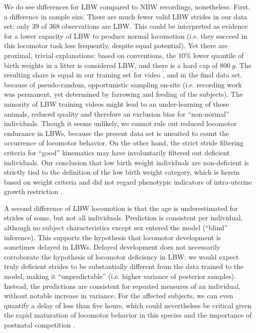 We do see differences for LBW compared to NBW recordings, nonetheless.
First, a difference in sample size.
There are much fewer valid LBW strides in our data set: only \(39\) of \(368\) observations are LBW.
This could be interpreted as evidence for a lower capacity  of LBW to produce normal locomotion (i.e. they succeed in this locomotor task less frequently, despite equal potential).
Yet there are proximal, trivial explanations: based on conventions, the \(10 \%\) lower quantile of birth weights in a litter is considered LBW, and there is a hard cap of \(800\ g\).
The resulting share is equal in our training set for video , and in the final data set, because of pseudo-random, opportunistic sampling on-site (i.e. recording work was permanent, yet determined by farrowing and feeding of the subjects).
The minority of LBW training videos might lead to an under-learning of those animals, reduced  quality and therefore an exclusion bias for ``non-normal'' individuals.
Though it seems unlikely, we cannot rule out reduced locomotor endurance in LBWs, because the present data set is unsuited to count the occurrence of locomotor behavior.
On the other hand, the strict stride filtering criteria for ``good'' kinematics may have involuntarily filtered out deficient individuals.
Our conclusion that low birth weight individuals are non-deficient is strictly tied to the definition of the low birth weight category, which is herein based on weight criteria and did not regard phenotypic indicators of intra-uterine growth restriction \citep[which we did not record, \textit{cf.}][]{Amdi2013}.


A second difference of LBW locomotion is that the age is underestimated for strides of some, but not all individuals.
Prediction is consistent per individual, although no subject characteristics except sex entered the model (``blind'' inference).
This supports the hypothesis that locomotor development is sometimes delayed in LBWs.
Delayed development does not necessarily corroborate the hypothesis of locomotor deficiency in LBW: we would expect truly deficient strides to be substantially different from the data trained to the model, making it ``unpredictable'' (i.e. higher variance of posterior samples).
Instead, the predictions are consistent for repeated measures of an individual, without notable increase in variance.
For the affected subjects, we can even quantify a delay of less than five hours, which could nevertheless be critical given the rapid maturation of locomotor behavior in this species \citep{VandenHole2017} and the importance of postnatal competition \citep{Litten2003}.


